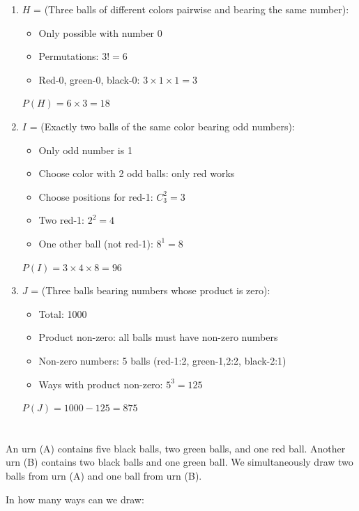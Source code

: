 \documentclass[12pt]{article}
\begin{document}
\begin{correctionbox}
\begin{enumerate}
    \item $H$ = (Three balls of different colors pairwise and bearing the same number):
    \begin{itemize}
        \item Only possible with number 0
        \item Permutations: $3! = 6$
        \item Red-0, green-0, black-0: $3 \times 1 \times 1 = 3$
    \end{itemize}
    $P(H) = 6 \times 3 = 18$
    
    \item $I$ = (Exactly two balls of the same color bearing odd numbers):
    \begin{itemize}
        \item Only odd number is 1
        \item Choose color with 2 odd balls: only red works
        \item Choose positions for red-1: $C_3^2 = 3$
        \item Two red-1: $2^2 = 4$
        \item One other ball (not red-1): $8^1 = 8$
    \end{itemize}
    $P(I) = 3 \times 4 \times 8 = 96$
    
    \item $J$ = (Three balls bearing numbers whose product is zero):
    \begin{itemize}
        \item Total: 1000
        \item Product non-zero: all balls must have non-zero numbers
        \item Non-zero numbers: 5 balls (red-1:2, green-1,2:2, black-2:1)
        \item Ways with product non-zero: $5^3 = 125$
    \end{itemize}
    $P(J) = 1000 - 125 = 875$
\end{enumerate}
\end{correctionbox}

\section{}
An urn (A) contains five black balls, two green balls, and one red ball. Another urn (B) contains two black balls and one green ball. We simultaneously draw two balls from urn (A) and one ball from urn (B).

In how many ways can we draw:
\end{document}

